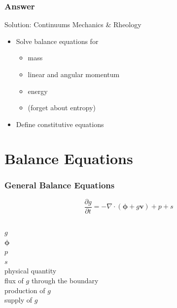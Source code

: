 \documentclass[hide notes,intlimits]{beamer}
\begin{document}
\begin{frame}
  \frametitle{Answer}

 \begin{block}{Solution: Continuums Mechanics \& Rheology}
   \begin{itemize}
     \item Solve balance equations for
       \begin{itemize}
       \item mass
       \item linear and angular momentum
       \item energy
       \item (forget about entropy)
       \end{itemize}
     \item Define constitutive equations
  \end{itemize}
\end{block}
\end{frame}


\section{Balance Equations}

\begin{frame}
  \frametitle{General Balance Equations}
  \begin{equation*}
   \frac{\partial g}{\partial t} = - \nabla \cdot \left(\boldsymbol{\phi} + g\mathbf{v}\right) + p + s
 \end{equation*}
 \begin{columns}
   \column[C]{0.1cm}
   $g$ \\
   $\boldsymbol{\phi}$ \\
   $p$ \\
   $s$ \\
   \column[C]{6cm}
   physical quantity \\
   flux of $g$ through the boundary \\
   production of $g$ \\
   supply of $g$
 \end{columns}
\end{frame}
\end{document}
